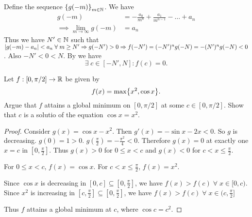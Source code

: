 \documentclass[12pt]{article}
\begin{document}
Define the sequence $\set{g(-m)}_{m \in \N}$. We have
\begin{align*}
    g(-m) &= -\frac{a_{0}}{m^{n}} + \frac{a_{1}}{m^{n-1}} - \dots + a_{n} \\
    \implies \lim_{m \to \infty} g(-m) &= a_{n}
\end{align*}
Thus we have $N' \in \mathbb{N}$ such that $\abs{g(-m) - a_{n}} < a_{n} \;\forall\; m \geq N' \implies g(-N') > 0 \implies f(-N') = (-N')^{n} g(-N) = - (N')^{n} g(-N) < 0$.
Also $-N' < 0 < N$. By  we have \[
    \exists\; c \in [-N', N] : f(c) = 0.
\]

\begin{problem}
    Let $f : [0, \pi / 2] \to \mathbb{R}$ be given by \[
        f(x) = \max\set{x^{2}, \cos x}.
    \] Argue that $f$ attains a global minimum on $[0, \pi / 2]$ at some $c \in [0, \pi / 2]$.
    Show that $c$ is a solutio of the equation $\cos x = x^{2}$.
\end{problem}
\begin{proof}
    Consider $g(x) = \cos x - x^{2}$.
    Then $g'(x) = - \sin x - 2x < 0$.
    So $g$ is decreasing.
    $g(0) = 1 > 0$.
    $g(\frac{\pi}{2}) = -\frac{\pi^{2}}{4} < 0$.
    Therefore $g(x) = 0$ at exactly one $x = c$ in $[0, \frac{\pi}{2}]$.
    Thus $g(x) > 0$ for $0 \leq x < c$ and $g(x) < 0$ for $c < x \leq \frac{\pi}{2}$.
    
    For $0 \leq x < c$, $f(x) = \cos x$.
    For $c < x \leq \frac{\pi}{2}$, $f(x) = x^{2}$.
    
    Since $\cos x$ is decreasing in $[0, c] \subseteq [0, \frac{\pi}{2}]$, we have $f(x) > f(c) \;\forall\; x \in [0, c)$.
    Since $x^{2}$ is increasing in $[c, \frac{\pi}{2}] \subseteq [0, \frac{\pi}{2}]$, we have $f(x) > f(c) \;\forall\; x \in (c, \frac{\pi}{2}]$
    
    Thus $f$ attains a global minimum at $c$, where $\cos c = c^{2}$.
\end{proof}
\end{document}

